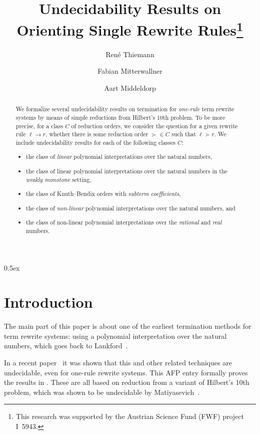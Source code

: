 \documentclass[11pt,a4paper]{article}
\begin{document}
\title{Undecidability Results on Orienting Single Rewrite Rules\footnote{This research was supported by the Austrian Science Fund (FWF) project I~5943.}}
\author{Ren\'e Thiemann}
\author{Fabian Mitterwallner}
\author{Aart Middeldorp}
\maketitle

\begin{abstract}
We formalize several undecidability results on termination 
for \emph{one-rule} term 
rewrite systems by means of simple reductions from Hilbert's 10th problem.
To be more precise, for a class $C$ of reduction orders, 
we consider the question for a given rewrite 
rule $\ell \to r$, whether there is some
reduction order ${\succ} \in C$ such that $\ell \succ r$. We include undecidability results for each of the following classes $C$:
\begin{itemize}
\item the class of \emph{linear} polynomial interpretations over
  the natural numbers, 
\item the class of linear polynomial interpretations over
  the natural numbers in the \emph{weakly monotone} setting, 
\item the class of Knuth--Bendix orders with \emph{subterm coefficients},
\item the class of \emph{non-linear} polynomial interpretations over the natural numbers, and
\item the class of non-linear polynomial interpretations over the \emph{rational} and \emph{real} numbers.
\end{itemize}
\end{abstract}

\tableofcontents

\parindent 0pt\parskip 0.5ex

\section{Introduction}

The main part of this paper is about 
one of the earliest termination
methods for term rewrite systems: using a
polynomial interpretation over the natural numbers, which goes back to
Lankford~\cite{L79}.

In a recent paper~\cite{MMT24} it was shown that this and other related
techniques are undecidable, even for one-rule rewrite systems. This
AFP entry formally proves the results in \cite{MMT24}. These are all
based on reduction from a variant of Hilbert's 10th problem, 
which was shown to be undecidable by Matiyasevich~\cite{M70}.








\end{document}
